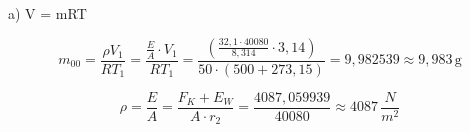 a) \quad \rho V = mRT

\[
m_{00} = \frac{\rho V_{1}}{R T_{1}} = \frac{\frac{E}{A} \cdot V_{1}}{R T_{1}} = \frac{\left( \frac{32,1 \cdot 40080}{8,314} \cdot 3,14 \right)}{50 \cdot (500 + 273,15)} = 9,982539 \approx 9,983 \, \text{g}
\]

\[
\rho = \frac{E}{A} = \frac{F_{K} + E_{W}}{A \cdot r_{2}} = \frac{4087,059939}{40080} \approx 4087 \, \frac{N}{m^2}
\]